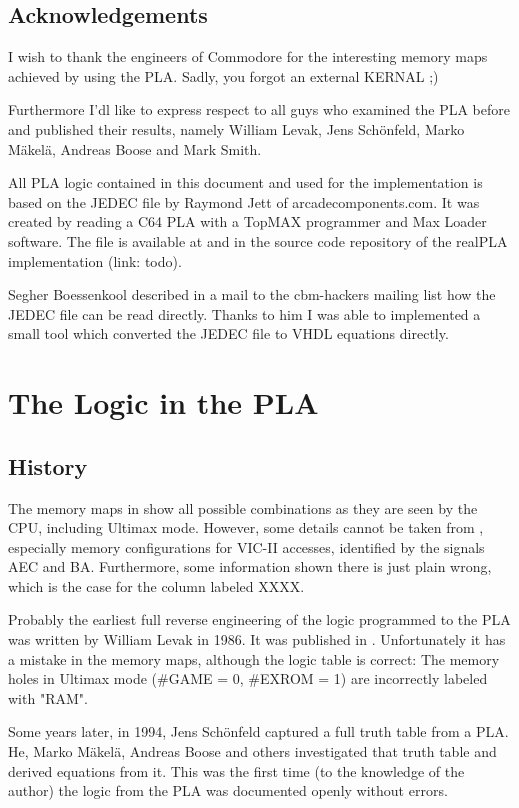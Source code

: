 \documentclass[a4paper,oneside]{memoir}
\begin{document}
\section{Acknowledgements}

I wish to thank the engineers of Commodore for the interesting memory maps
achieved by using the PLA. Sadly, you forgot an external KERNAL ;)

Furthermore I'dl like to express respect to all guys who examined the PLA
before and published their results, namely William Levak, Jens Schönfeld,
Marko Mäkelä, Andreas Boose and Mark Smith.

All PLA logic contained in this document and used for the implementation is
based on the JEDEC file by Raymond Jett of arcadecomponents.com. It was
created by reading a C64 PLA with a TopMAX programmer and Max Loader
software. The file is available at \cite{AC12} and in the source code
repository of the realPLA implementation (link: todo).

Segher Boessenkool described in a mail to the cbm-hackers mailing list how
the JEDEC file can be read directly. Thanks to him I was able to implemented
a small tool which converted the JEDEC file to VHDL equations directly.

\chapter{The Logic in the PLA}

\section{History}

The memory maps in \cite {PRG83} show all possible combinations as they are
seen by the CPU, including Ultimax mode. However, some details cannot be
taken from \cite{PRG83}, especially memory configurations for VIC-II
accesses, identified by the signals AEC and BA. Furthermore, some information
shown there is just plain wrong, which is the case for the column
labeled XXXX.

Probably the earliest full reverse engineering of the logic programmed to
the PLA was written by William Levak in 1986. It was published in \cite
{Lev86}. Unfortunately it has a mistake in the memory maps, although the
logic table is correct: The memory holes in Ultimax mode (\#GAME = 0, \#EXROM
= 1) are incorrectly labeled with "RAM".

Some years later, in 1994, Jens Schönfeld captured a full truth
table from a PLA. He, Marko Mäkelä, Andreas Boose and others \cite
{PLA95} investigated that truth table and derived equations from it.
This was the first time (to the knowledge of the author) the logic
from the PLA was documented openly without errors.
\end{document}
